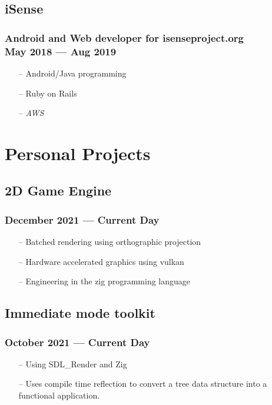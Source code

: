 \documentclass[11pt]{article}
\begin{document}
\begin{multicols}{2}
\subsection{iSense}
\subsubsection{Android and Web developer for isenseproject.org\\ May 2018 --- Aug 2019}
\begin{itemize}[noitemsep, topsep=0pt]
	\item[--] Android/Java programming
	\item[--] Ruby on Rails
	\item[--] \emph{AWS}
\end{itemize}

\columnbreak

\section{Personal Projects}

\subsection{2D Game Engine}
\subsubsection{December 2021 --- Current Day}
\begin{itemize}[noitemsep, topsep=0pt]
	\item[--] Batched rendering using orthographic projection
	\item[--] Hardware accelerated graphics using vulkan
	\item[--] Engineering in the zig programming language
\end{itemize}

\subsection{Immediate mode toolkit}
\subsubsection{October 2021 --- Current Day}
\begin{itemize}[noitemsep, topsep=0pt]
	\item[--] Using SDL\_Render and Zig
	\item[--] Uses compile time reflection to convert
		a tree data structure into a functional
		application.
\end{itemize}


\end{multicols}
\end{document}
